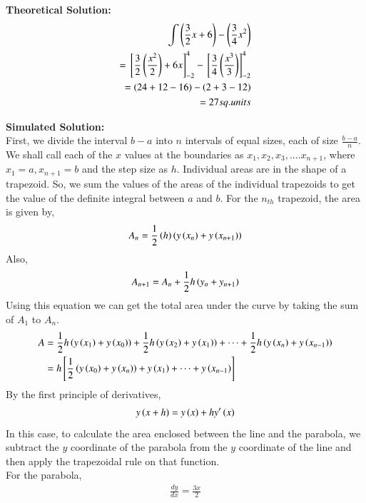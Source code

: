 \documentclass[journal]{IEEEtran}
\begin{document}
\textbf{Theoretical Solution:}\\

\begin{align}
	\int{\ensuremath{\left(\frac{3}{2}x + 6\right)} - {\ensuremath{\left(\frac{3}{4}x^2\right)}}}\\
	= {}\left[\frac{3}{2}\left(\frac{x^2}{2}\right) + 6x\right]_{-2}^{4} - {}\left[\frac{3}{4}\left(\frac{x^3}{3}\right)\right]_{-2}^{4}\\
	= \left(24 + 12 - 16\right) - \left(2 + 3 - 12\right)\\
	= 27 sq.units
\end{align}

\textbf{Simulated Solution:}\\

First, we divide the interval $b-a$ into $n$ intervals of equal sizes, each of size $\frac{b-a}{n}$. We shall call each of the $x$ values at the boundaries as $x_1, x_2, x_3,....x_{n+1}$, where $x_1 = a, x_{n+1} = b$ and the step size as $h$. Individual areas are in the shape of a trapezoid. So, we sum the values of the areas of the individual trapezoids to get the value of the definite integral between $a$ and $b$. For the $n_{th}$ trapezoid, the area is given by,
\begin{align}
	A_n = \frac{1}{2} \left(h\right) \left(y\left(x_n\right) + y\left(x_{n+1}\right)\right)
\end{align}
Also,
\begin{align}
	A_{n+1} = A_n + \frac{1}{2} h \left(y_n + y_{n+1}\right)
\end{align}
Using this equation we can get the total area under the curve by taking the sum of $A_1$ to $A_n$.\\
\begin{align}
	A &= \frac{1}{2} h \left(y \left(x_1\right) + y \left(x_0\right)\right)+ \frac{1}{2} h \left(y \left(x_2\right) + y \left(x_1\right)\right) + \dots + \frac{1}{2} h \left(y \left(x_n\right) + y\left(x_{n-1}\right)\right)\\
	&= h {}\left[\frac{1}{2} \left(y \left(x_0\right) + y \left(x_n\right)\right) + y \left(x_1\right) + \dots + y \left(x_{n-1}\right)\right]
\end{align}
By the first principle of derivatives,\\
\begin{align}
	y\left(x+h\right) = y\left(x\right) + h y^{\prime}\left(x\right)
\end{align}
In this case, to calculate the area enclosed between the line and the parabola, we subtract the $y$ coordinate of the parabola from the $y$ coordinate of the line and then apply the trapezoidal rule on that function.\\
For the parabola,
\begin{align}
	\frac{dy}{dx} = \frac{3x}{2}
\end{align}
\end{document}
